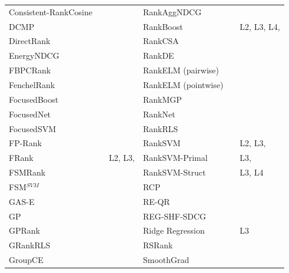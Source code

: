 \documentclass{sig-alternate}
\begin{document}
\begin{table}[!hp]
\begin{tabular}{lll|lll}
Consistent-RankCosine & \cite{Ravikumar2011} & \cite{Tan2013} & RankAggNDCG & \cite{Wang2013} & \cite{Wang2013} \\ 
DCMP & \cite{Renjifo2012}  & \cite{Renjifo2012}  & RankBoost & \cite{Freund2003} & L2, L3, L4, \cite{Busa-Fekete2013, Alcantara2010} \\ 
DirectRank & \cite{Tan2013} & \cite{Tan2013} & RankCSA & \cite{He2010} & \cite{He2010} \\ 
EnergyNDCG & \cite{Freno2011} & \cite{Freno2011} & RankDE & \cite{Bollegala2011} & \cite{Sato2013} \\ 
FBPCRank & \cite{Lai2011} & \cite{Lai2011} & RankELM (pairwise) & \cite{Zong2013} & \cite{Zong2013} \\ 
FenchelRank & \cite{Lai2013} & \cite{Lai2013, Lai2013b, Laporte2013} & RankELM (pointwise) & \cite{Zong2013} & \cite{Zong2013} \\ 
FocusedBoost & \cite{Niu2012} & \cite{Niu2012} & RankMGP & \cite{Lin2012} & \cite{Lin2012} \\ 
FocusedNet & \cite{Niu2012} & \cite{Niu2012} & RankNet & \cite{Burges2005} & \cite{Busa-Fekete2013, Papini2012, Niu2012} \\ 
FocusedSVM & \cite{Niu2012} & \cite{Niu2012} & RankRLS & \cite{Pahikkala2009} & \cite{Pahikkala2010} \\ 
FP-Rank & \cite{Song2013} & \cite{Song2013} & RankSVM & \cite{Herbrich1999, Joachims2002} & L2, L3, \cite{Busa-Fekete2013, Freno2011, He2010, Alcantara2010} \\ 
FRank & \cite{Tsai2007} & L2, L3, \cite{Wang2012} & RankSVM-Primal &  & L3, \cite{Lai2011} \\ 
FSMRank & \cite{Lai2013c} & \cite{Lai2013c,Laporte2013} & RankSVM-Struct &  & L3, L4 \\
FSM$^{SVM}$ & \cite{Lai2013c} & \cite{Lai2013c} & RCP & \cite{Elsas2008} & \cite{Elsas2008} \\ 
GAS-E & \cite{Geng2007} & \cite{Lai2013c} & RE-QR & \cite{Veloso2010} & \cite{Veloso2010} \\
GP & \cite{DeAlmeida2007} & \cite{Alcantara2010} & REG-SHF-SDCG & \cite{Wu2009} & \cite{Wu2009} \\  
GPRank & \cite{Silva2009} & \cite{Torkestani2012} & Ridge Regression & \cite{Cossock2006} & L3 \\
GRankRLS & \cite{Pahikkala2010} & \cite{Pahikkala2010} & RSRank & \cite{Sun2009} & \cite{Lai2013} \\ 
GroupCE & \cite{Lin2011} & \cite{Lin2011} & SmoothGrad & \cite{Le2007} & \cite{Tan2013} \\ 

\end{tabular}
\end{table}
\end{document}
